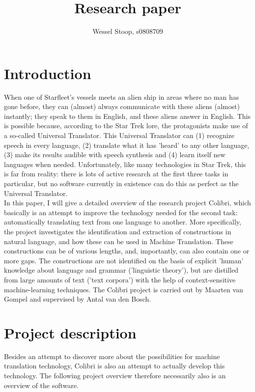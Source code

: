 \documentclass[12pt]{article}
\title{Research paper}
\author{Wessel Stoop, s0808709}
\begin{document}
\maketitle

\section{Introduction}

When one of Starfleet's vessels meets an alien ship in areas where no man has gone before, they can (almost) always communicate with these aliens (almost) instantly; they speak to them in English, and these aliens answer in English. This is possible because, according to the Star Trek lore, the protagonists make use of a so-called Universal Translator. This Universal Translator can (1) recognize speech in every language, (2) translate what it has 'heard' to any other language, (3) make its results audible with speech synthesis and (4) learn itself new languages when needed. Unfortunately, like many technologies in Star Trek, this is far from reality: there is lots of active research at the first three tasks in particular, but no software currently in existence can do this as perfect as the Universal Translator. \\\indent
In this paper, I will give a detailed overview of the research project Colibri, which basically is an attempt to improve the technology needed for the second task: automatically translating text from one language to another. More specifically, the project investigates the identification and extraction of constructions in natural language, and how these can be used in Machine Translation. These constructions can be of various lengths, and, importantly, can also contain one or more gaps. The constructions are not identified on the basis of explicit 'human' knowledge about language and grammar ('linguistic theory'), but are distilled from large amounts of text ('text corpora') with the help of context-sensitive machine-learning techniques. The Colibri project is carried out by Maarten van Gompel and supervised by Antal van den Bosch.







\section{Project description}

Besides an attempt to discover more about the possibilities for machine translation technology, Colibri is also an attempt to actually develop this technology. The following project overview therefore necessarily also is an overview of the software.
\end{document}
